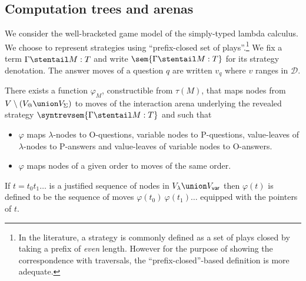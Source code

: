 \subsection{Computation trees and arenas}
We consider the well-bracketed game model of the simply-typed lambda
calculus.  We choose to represent strategies using ``prefix-closed
set of plays''.\footnote{In the literature, a strategy is commonly
defined as a set of plays closed by taking a prefix of \emph{even}
length. However for the purpose of showing the correspondence with
traversals, the ``prefix-closed''-based definition is more
adequate.} We fix a term $\Gamma \stentail M : T$ and write
$\sem{\Gamma \stentail M : T}$ for its strategy denotation. The
answer moves of a question $q$ are written $v_q$ where $v$ ranges in
$\mathcal{D}$.

\begin{proposition}
There exists a function $\varphi_M$, constructible from $\tau(M)$,
that maps nodes from $V\setminus (V_@ \union V_\Sigma)$ to moves of
the interaction arena underlying the revealed strategy
$\syntrevsem{\Gamma \stentail M : T}$ and such that
\begin{itemize}
\item $\varphi$ maps $\lambda$-nodes to O-questions, variable
nodes to P-questions, value-leaves of $\lambda$-nodes to
P-answers and value-leaves of variable nodes to O-answers.

\item $\varphi$ maps nodes of a given order to moves of
the same order.
\end{itemize}
\end{proposition}
If $t = t_0 t_1 \ldots$ is a justified sequence of nodes in
$V_\lambda \union V_{\sf var}$ then $\varphi(t)$ is defined to
be the sequence of moves $\varphi(t_0)\ \varphi(t_1) \ldots$
equipped with the pointers of $t$.


